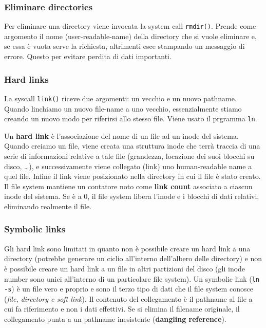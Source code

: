 \documentclass[12pt, letterpaper]{article}
\begin{document}
			\subsubsection{Eliminare directories}
				Per eliminare una directory viene invocata la system call \texttt{rmdir()}. Prende come argomento il nome (user-readable-name) della directory che si vuole eliminare e, se essa è vuota serve la richiesta, altrimenti esce stampando un messaggio di errore. Questo per evitare perdita di dati importanti.
				
			\subsubsection{Hard links}
				La syscall \texttt{link()} riceve due argomenti: un vecchio e un nuovo pathname. Quando linchiamo un nuovo file-name a uno vecchio, essenzialmente stiamo creando un nuovo modo per riferirsi allo stesso file. Viene usato il prgramma \texttt{ln}.
				
				Un \textbf{hard link} è l'associazione del nome di un file ad un inode del sistema. Quando creiamo un file, viene creata una struttura inode che terrà traccia di una serie di informazioni relative a tale file (grandezza, locazione dei suoi blocchi su disco, \dots), e successivamente viene collegato (link) uno human-readable name a quel file. Infine il link viene posizionato nella directory in cui il file è stato creato. Il file system mantiene un contatore noto come \textbf{link count} associato a ciascun inode del sistema. Se è a 0, il file system libera l'inode e i blocchi di dati relativi, eliminando realmente il file.
				
			\subsubsection{Symbolic links}
				Gli hard link sono limitati in quanto non è possibile creare un hard link a una directory (potrebbe generare un ciclio all'interno dell'albero delle directory) e non è possibile creare un hard link a un file in altri partizioni del disco (gli inode number sono unici all'interno di un particolare file system).
				Un symbolic link (\texttt{ln -s}) è un file vero e proprio e sono il terzo tipo di dati che il file system conosce (\textit{file, directory e soft link}). Il contenuto del collegamento è il pathname al file a cui fa riferimento e non i dati effettivi. Se si elimina il filename originale, il collegamento punta a un pathname inesistente (\textbf{dangling reference}).
				
\end{document}
